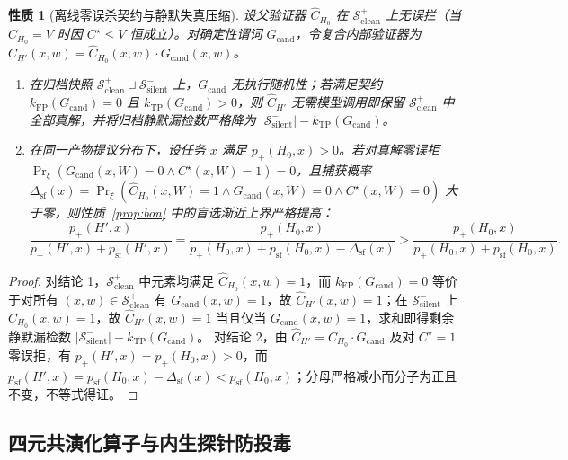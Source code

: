 \documentclass[UTF8,a4paper,10.5pt]{ctexart}
\newtheorem{prop}{性质}
\newcommand{\Sclean}{\mathcal{S}^+_{\mathrm{clean}}}
\newcommand{\Ssilent}{\mathcal{S}^-_{\mathrm{silent}}}
\begin{document}
\begin{prop}[离线零误杀契约与静默失真压缩]
\label{prop:zerofp}
设父验证器 $\hat{C}_{H_0}$ 在 $\Sclean$ 上无误拦（当 $\hat{C}_{H_0}=V$ 时因 $C^\star\le V$ 恒成立）。对确定性谓词 $G_{\mathrm{cand}}$，令复合内部验证器为 $\hat{C}_{H'}(x,w)=\hat{C}_{H_0}(x,w)\cdot G_{\mathrm{cand}}(x,w)$。
\begin{enumerate}
  \item 在归档快照 $\Sclean\sqcup\Ssilent$ 上，$G_{\mathrm{cand}}$ 无执行随机性；若满足契约 $k_{\mathrm{FP}}(G_{\mathrm{cand}})=0$ 且 $k_{\mathrm{TP}}(G_{\mathrm{cand}})>0$，则 $\hat{C}_{H'}$ 无需模型调用即保留 $\Sclean$ 中全部真解，并将归档静默漏检数严格降为 $|\Ssilent|-k_{\mathrm{TP}}(G_{\mathrm{cand}})$。
  \item 在同一产物提议分布下，设任务 $x$ 满足 $p_+(H_0,x)>0$。若对真解零误拒 $\Pr_\xi(G_{\mathrm{cand}}(x,W)=0 \land C^\star(x,W)=1)=0$，且捕获概率 $\Delta_{\mathrm{sf}}(x)=\Pr_\xi(\hat{C}_{H_0}(x,W)=1 \land G_{\mathrm{cand}}(x,W)=0 \land C^\star(x,W)=0)$ 大于零，则性质~\ref{prop:bon} 中的盲选渐近上界严格提高：
  \begin{equation}
    \frac{p_+(H',x)}{p_+(H',x)+p_{\mathrm{sf}}(H',x)}
    = \frac{p_+(H_0,x)}{p_+(H_0,x)+p_{\mathrm{sf}}(H_0,x)-\Delta_{\mathrm{sf}}(x)}
    > \frac{p_+(H_0,x)}{p_+(H_0,x)+p_{\mathrm{sf}}(H_0,x)}.
  \end{equation}
\end{enumerate}
\end{prop}
\begin{proof}
对结论 1，$\Sclean$ 中元素均满足 $\hat{C}_{H_0}(x,w)=1$，而 $k_{\mathrm{FP}}(G_{\mathrm{cand}})=0$ 等价于对所有 $(x,w)\in\Sclean$ 有 $G_{\mathrm{cand}}(x,w)=1$，故 $\hat{C}_{H'}(x,w)=1$；在 $\Ssilent$ 上 $\hat{C}_{H_0}(x,w)=1$，故 $\hat{C}_{H'}(x,w)=1$ 当且仅当 $G_{\mathrm{cand}}(x,w)=1$，求和即得剩余静默漏检数 $|\Ssilent|-k_{\mathrm{TP}}(G_{\mathrm{cand}})$。
对结论 2，由 $\hat{C}_{H'}=\hat{C}_{H_0}\cdot G_{\mathrm{cand}}$ 及对 $C^\star=1$ 零误拒，有 $p_+(H',x)=p_+(H_0,x)>0$，而 $p_{\mathrm{sf}}(H',x)=p_{\mathrm{sf}}(H_0,x)-\Delta_{\mathrm{sf}}(x)<p_{\mathrm{sf}}(H_0,x)$；分母严格减小而分子为正且不变，不等式得证。
\end{proof}

\subsection{四元共演化算子与内生探针防投毒}
\label{sec:modules}
\end{document}
